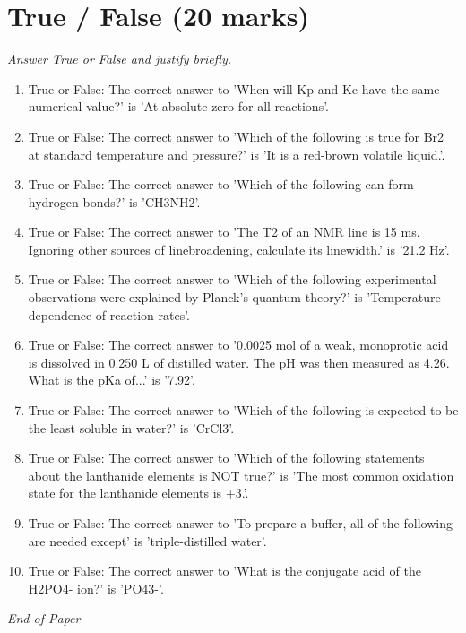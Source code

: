 \documentclass[12pt]{article}
\begin{document}
\section*{True / False (20 marks)}
\textit{Answer True or False and justify briefly.}
\begin{enumerate}[label=\arabic*.]
\item True or False: The correct answer to 'When will Kp and Kc have the same numerical value?' is 'At absolute zero for all reactions'.
\item True or False: The correct answer to 'Which of the following is true for Br2 at standard temperature and pressure?' is 'It is a red-brown volatile liquid.'.
\item True or False: The correct answer to 'Which of the following can form hydrogen bonds?' is 'CH3NH2'.
\item True or False: The correct answer to 'The T2 of an NMR line is 15 ms. Ignoring other sources of linebroadening, calculate its linewidth.' is '21.2 Hz'.
\item True or False: The correct answer to 'Which of the following experimental observations were explained by Planck's quantum theory?' is 'Temperature dependence of reaction rates'.
\item True or False: The correct answer to '0.0025 mol of a weak, monoprotic acid is dissolved in 0.250 L of distilled water. The pH was then measured as 4.26. What is the pKa of...' is '7.92'.
\item True or False: The correct answer to 'Which of the following is expected to be the least soluble in water?' is 'CrCl3'.
\item True or False: The correct answer to 'Which of the following statements about the lanthanide elements is NOT true?' is 'The most common oxidation state for the lanthanide elements is +3.'.
\item True or False: The correct answer to 'To prepare a buffer, all of the following are needed except' is 'triple-distilled water'.
\item True or False: The correct answer to 'What is the conjugate acid of the H2PO4- ion?' is 'PO43-'.
\end{enumerate}

\vfill
\noindent\textit{End of Paper}
\end{document}

